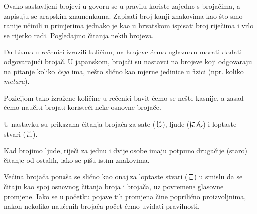 	\vspace{5pt}
	Ovako sastavljeni brojevi u govoru se u pravilu koriste zajedno s brojačima, a zapisuju se arapskim znamenkama. Zapisati broj kanji znakovima kao što smo ranije učinili u primjerima jednako je kao u hrvatskom ispisati broj riječima i vrlo se rijetko radi. Pogledajmo čitanja nekih brojeva.
	
	\begin{reibun}
	\end{reibun}

	
	Da bismo u rečenici izrazili količinu, na brojeve ćemo uglavnom morati dodati odgovarajući brojač. U japanskom, brojači su nastavci na brojeve koji odgovaraju na pitanje koliko \textit{čega} ima, nešto slično kao mjerne jedinice u fizici (npr. koliko \textit{metara}).
	
	Pozicijom tako izražene količine u rečenici bavit ćemo se nešto kasnije, a zasad ćemo naučiti brojati koristeći neke osnovne brojače.
	
	\newpage
	
	U nastavku su prikazana čitanja brojača za sate (じ), ljude (にん) i loptaste stvari (こ).
	
	Kad brojimo ljude, riječi za jednu i dvije osobe imaju potpuno drugačije (staro) čitanje od ostalih, iako se pišu istim znakovima.
	
	Većina brojača ponaša se slično kao onaj za loptaste stvari (こ) u smislu da se čitaju kao spoj osnovnog čitanja broja i brojača, uz povremene glasovne promjene. Iako se u početku pojave tih promjena čine poprilično proizvoljnima, nakon nekoliko naučenih brojača počet ćemo uviđati pravilnosti.
	
